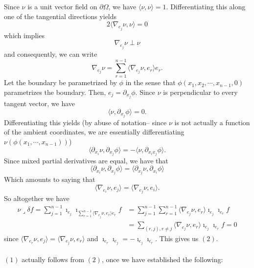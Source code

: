 {Since $\nu$ is a unit vector field on $\partial\Omega$, we have $\langle \nu,\nu \rangle=1$. Differentiating this along one of the tangential directions yields $$2\langle \nabla_{e_j}\nu,\nu\rangle=0 $$ which implies $$\nabla_{e_j}\nu \perp \nu$$ and consequently, we can write $$\nabla_{e_j}\nu=\sum_{r=1}^{n-1} \langle\nabla_{e_j}\nu,e_r \rangle e_r.$$
Let the boundary be parametrized by $\phi$ in the sense that $\phi(x_1,x_2,\cdots,x_{n-1},0)$ parametrizes the boundary. Then, $e_j=\partial_{x_j}\phi$. Since $\nu$ is perpendicular to every tangent vector, we have $$\langle \nu,\partial_{x_j}\phi\rangle=0. $$
Differentiating this yields (by abuse of notation-- since $\nu$ is not actually a function of the ambient coordinates, we are essentially differentiating $\nu(\phi(x_1,\cdots,x_{n-1}))$) $$\langle\partial_{x_i}\nu,\partial_{x_j}\phi\rangle=-\langle \nu,\partial_{x_i x_j}\phi \rangle. $$
Since mixed partial derivatives are equal, we have that $$\langle \partial_{x_i}\nu, \partial_{x_j}\phi\rangle=\langle \partial_{x_j}\nu,\partial_{x_i}\phi\rangle $$
Which amounts to saying that $$\langle \nabla_{e_i}\nu,e_j \rangle=\langle \nabla_{e_j}\nu,e_i\rangle. $$
So altogether we have 
\begin{align*}\nu \lrcorner \delta f =\sum_{j=1}^{n-1} \imath_{e_j}\imath_{\sum_{r=1}^{n-1}\langle \nabla_{e_j}\nu,e_r \rangle e_r}f&=\sum_{j=1}^{n-1}\sum_{r=1}^{n-1}\langle \nabla_{e_j}\nu,e_r \rangle \imath_{e_j}\imath_{e_r}f\\ &= \sum_{(r,j), r\neq j}\langle \nabla_{e_j}\nu,e_r\rangle \imath_{e_j}\imath_{e_r}f=0 \end{align*}
since $\langle \nabla_{e_r}\nu,e_j\rangle=\langle \nabla_{e_j}\nu,e_r\rangle$ and $\imath_{e_r}\imath_{e_j}=-\imath_{e_j}\imath_{e_r}$. This gives us $(2)$.
\\\\ $(1)$ actually follows from $(2)$, once we have established the following: 

}
